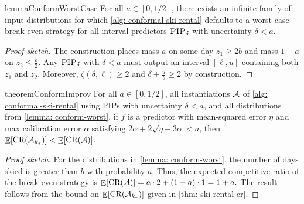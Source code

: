 \begin{restatable}{lemma}{ConformWorstCase}\label{lemma: conform-worst}
    For all $a \in [0,1/2]$, there exists an infinite family of input distributions for which \cref{alg: conformal-ski-rental} defaults to a worst-case break-even strategy for all interval predictors $\textsc{PIP}_\delta$ with uncertainty $\delta < a$.
\end{restatable}
\begin{proof}[Proof sketch]
    The construction places mass $a$ on some day $z_1 \geq 2b$ and mass $1-a$ on $z_2 \leq \frac{b}{2}$. Any $\textsc{PIP}_\delta$ with $\delta < a$ must output an interval $[\ell, u]$ containing both $z_1$ and $z_2$. Moreover, $\zeta(\delta, \ell) \geq 2$ and $\delta + \frac{u}{b} \geq 2$ by construction.
\end{proof}

\begin{restatable}{theorem}{ConformImprov} \label{thm: conform-improv}
    For all $a \in [0, 1/2]$, all instantiations $\mathcal{A}$ of \cref{alg: conformal-ski-rental} using PIPs with uncertainty $\delta < a$, and all distributions from \cref{lemma: conform-worst}, if $f$ is a predictor with mean-squared error $\eta$ and max calibration error $\alpha$ satisfying $2\alpha + 2\sqrt{\eta + 3\alpha} < a$, then $\mathop{\mathbb{E}}[\textnormal{CR}(\mathcal{A}_{k_*})] < \mathop{\mathbb{E}}[\textnormal{CR}(\mathcal{A})]$.
\end{restatable}
\begin{proof}[Proof sketch]
For the distributions in \cref{lemma: conform-worst}, the number of days skied is greater than $b$ with probability $a$. Thus, the expected competitive ratio of the break-even strategy is
$\mathop{\mathbb{E}}[\textnormal{CR}(\mathcal{A})] = a \cdot 2 + (1-a)\cdot1 = 1 + a.$
The result follows from the bound on $\mathop{\mathbb{E}}[\textnormal{CR}(\mathcal{A}_{k_*})]$ given in \cref{thm: ski-rental-cr}.
\end{proof}